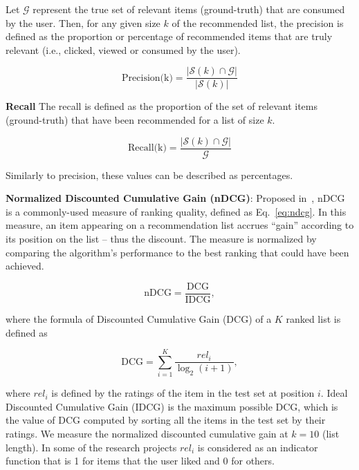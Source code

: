         Let $\mathcal{G}$ represent the true set of relevant items (ground-truth) that are consumed by the user. Then, for any given size $k$ of the recommended list, the precision is defined as the proportion or percentage of recommended items that are truly relevant (i.e., clicked, viewed or consumed by the user). 
        
        \begin{equation}
        \text{Precision(k)}=\frac{|\mathcal{S}(k) \displaystyle \cap \mathcal{G}|}{|\mathcal{S}(k)|}
        \label{eq:precision}
        \end{equation}
        
        
        \textbf{Recall}
        The recall is defined as the proportion of the set of relevant items (ground-truth) that have been recommended for a list of size $k$.
        
        \begin{equation}
        \text{Recall(k)}=\frac{|\mathcal{S}(k) \displaystyle \cap \mathcal{G}|}{\mathcal{G}}
        \label{eq:recall}
        \end{equation}
        
        Similarly to precision, these values can be described as percentages.
        
        \textbf{Normalized Discounted Cumulative Gain (nDCG)}: Proposed in~\cite{jarvelin2002cumulated}, nDCG is a commonly-used measure of ranking quality, defined as Eq.~\eqref{eq:ndcg}. In this measure, an item appearing on a recommendation list accrues ``gain'' according to its position on the list -- thus the discount. The measure is normalized by comparing the algorithm's performance to the best ranking that could have been achieved. 

        \begin{equation}
        \text{nDCG}=\frac{\text{DCG}}{\text{IDCG}},
        \label{eq:ndcg}
        \end{equation}
        
        where the formula of Discounted Cumulative Gain (DCG) of a $K$ ranked list is defined as
        
        \begin{equation}
        \text{DCG}=\sum_{i=1}^K\frac{{rel}_i}{\log_2(i+1)},
        \end{equation}
        
        where ${rel}_i$ is defined by the ratings of the item in the test set at position $i$. Ideal Discounted Cumulative Gain (IDCG) is the maximum possible DCG, which is the value of DCG computed by sorting all the items in the test set by their ratings.
        We measure the normalized discounted cumulative gain at $k=10$ (list length). In some of the research projects ${rel}_i$ is considered as an indicator function that is 1 for items that the user liked and 0 for others.
        
